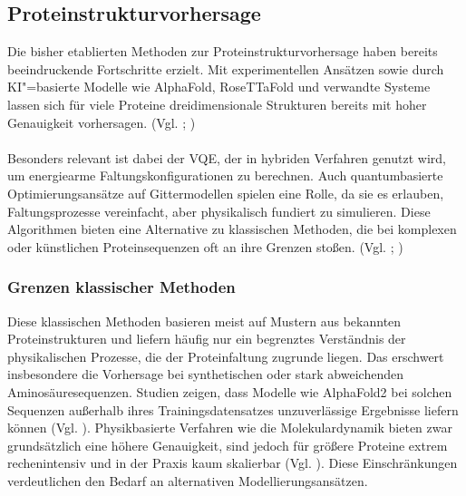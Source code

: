 \subsection{Proteinstrukturvorhersage}
\label{med:protein}
Die bisher etablierten Methoden zur Proteinstrukturvorhersage haben bereits beeindruckende Fortschritte erzielt. Mit experimentellen Ansätzen sowie durch KI"=basierte Modelle wie AlphaFold, RoseTTaFold und verwandte Systeme lassen sich für viele Proteine dreidimensionale Strukturen bereits mit hoher Genauigkeit vorhersagen. (Vgl. \cite{jumperHighlyAccurateProtein2021}; \cite{baekAccuratePredictionProtein2021})\\
\\
Besonders relevant ist dabei der VQE, der in hybriden Verfahren genutzt wird, um energiearme Faltungskonfigurationen zu berechnen. Auch quantumbasierte Optimierungsansätze auf Gittermodellen spielen eine Rolle, da sie es erlauben, Faltungsprozesse vereinfacht, aber physikalisch fundiert zu simulieren. Diese Algorithmen bieten eine Alternative zu klassischen Methoden, die bei komplexen oder künstlichen Proteinsequenzen oft an ihre Grenzen stoßen. (Vgl. \cite{doga_perspective_2024}; \cite{robert_resource-efficient_2021})

\subsubsection*{Grenzen klassischer Methoden}
Diese klassischen Methoden basieren meist auf Mustern aus bekannten Proteinstrukturen und liefern häufig nur ein begrenztes Verständnis der physikalischen Prozesse, die der Proteinfaltung zugrunde liegen. Das erschwert insbesondere die Vorhersage bei synthetischen oder stark abweichenden Aminosäuresequenzen. Studien zeigen, dass Modelle wie AlphaFold2 bei solchen Sequenzen außerhalb ihres Trainingsdatensatzes unzuverlässige Ergebnisse liefern können (Vgl. \cite{outeiralCurrentStructurePredictors2022}). Physikbasierte Verfahren wie die Molekulardynamik bieten zwar grundsätzlich eine höhere Genauigkeit, sind jedoch für größere Proteine extrem rechenintensiv und in der Praxis kaum skalierbar (Vgl. \cite{doga_perspective_2024}). Diese Einschränkungen verdeutlichen den Bedarf an alternativen Modellierungsansätzen.

